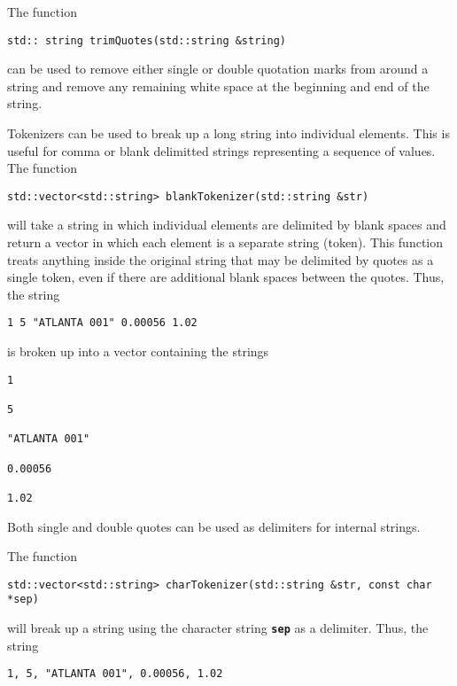 The function

{
\color{red}
\begin{Verbatim}[fontseries=b]
std:: string trimQuotes(std::string &string)
\end{Verbatim}
}

can be used to remove either single or double quotation marks from around a string and remove any remaining white space at the beginning and end of the string.

Tokenizers can be used to break up a long string into individual elements. This
is useful for comma or blank delimitted strings representing a sequence of
values. The function

{
\color{red}
\begin{Verbatim}[fontseries=b]
std::vector<std::string> blankTokenizer(std::string &str)
\end{Verbatim}
}

will take a string in which individual elements are delimited by blank spaces and return a vector in which each element is a separate string (token). This function treats anything inside the original string that may be delimited by quotes as a single token, even if there are additional blank spaces between the quotes. Thus, the string

{
\color{red}
\begin{Verbatim}[fontseries=b]
1 5 "ATLANTA 001" 0.00056 1.02
\end{Verbatim}
}

is broken up into a vector containing the strings

{
\color{red}
\begin{Verbatim}[fontseries=b]
1

5

"ATLANTA 001"

0.00056

1.02
\end{Verbatim}
}

Both single and double quotes can be used as delimiters for internal strings.

The function
{
\color{red}
\begin{Verbatim}[fontseries=b]
std::vector<std::string> charTokenizer(std::string &str, const char *sep)
\end{Verbatim}
}

will break up a string using the character string \texttt{\textbf{sep}} as a delimiter.
Thus, the string

{
\color{red}
\begin{Verbatim}[fontseries=b]
1, 5, "ATLANTA 001", 0.00056, 1.02
\end{Verbatim}
}

